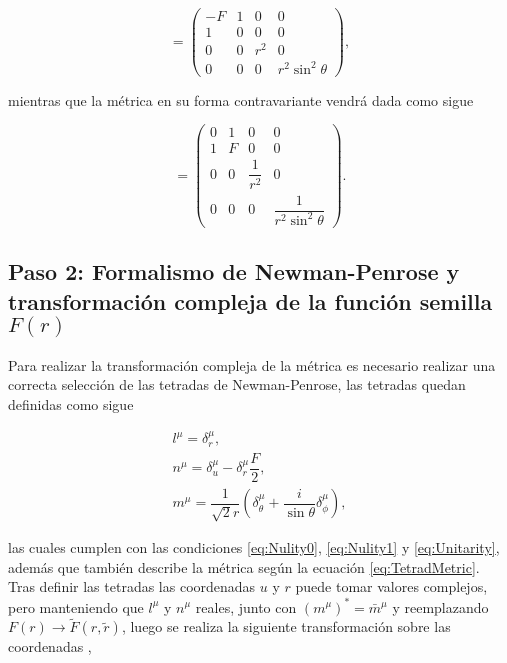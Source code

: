     \begin{equation}
        [g_{\mu\nu}]=\begin{pmatrix}
            -F & 1 & 0   & 0 \\
             1 & 0 & 0   & 0 \\
             0 & 0 & r^2 & 0\\
             0 & 0 & 0 & r^2\sin^2\theta
        \end{pmatrix},
    \end{equation}
    
    mientras que la métrica en su forma contravariante vendrá dada como sigue
    
    \begin{equation}
        [g^{\mu\nu}]=\begin{pmatrix}
             0 & 1 & 0   & 0 \\
             1 & F & 0   & 0 \\
             0 & 0 & \dfrac{1}{r^2} & 0\\
             0 & 0 & 0 & \dfrac{1}{r^2\sin^2\theta}
        \end{pmatrix}.
    \end{equation}
    
\subsection{Paso 2: Formalismo de Newman-Penrose y transformación compleja de la función semilla $F(r)$}

Para realizar la transformación compleja de la métrica es necesario realizar una correcta selección de las tetradas de Newman-Penrose, las tetradas quedan definidas como sigue \cite{AplicabilityOfJN}

\begin{gather}
    l^\mu = \delta^\mu_r, \\
    n^\mu = \delta^\mu_u-\delta^\mu_r\dfrac{F}{2}, \\
    m^\mu = \dfrac{1}{\sqrt{2}r}\left(\delta^\mu_\theta+ \dfrac{i}{\sin \theta}\delta^\mu_\phi\right),
\end{gather}

las cuales cumplen con las condiciones \eqref{eq:Nulity0}, \eqref{eq:Nulity1} y \eqref{eq:Unitarity}, además que también describe la métrica según la ecuación \eqref{eq:TetradMetric}.\\

Tras definir las tetradas las coordenadas $u$ y $r$ puede tomar valores complejos, pero manteniendo que $l^\mu$ y $n^\mu$ reales, junto con $(m^\mu)^*=\bar{m}^\mu$ y reemplazando $F(r)\rightarrow \tilde{F}(r,\tilde{r})$, luego se realiza la siguiente transformación sobre las coordenadas \cite{AplicabilityOfJN},

